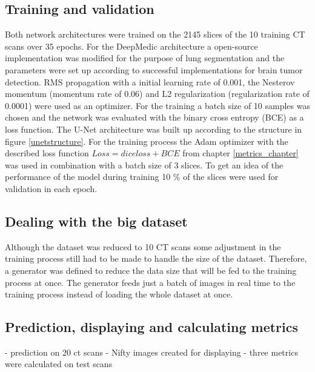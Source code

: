 \subsection{Training and validation}
Both network architectures were trained on the 2145 slices of the 10 training CT scans over 35 epochs.\newline
For the DeepMedic architecture a open-source implementation \cite{deepmedic} was modified for the purpose of lung segmentation and the parameters were set up according to successful implementations for brain tumor detection. RMS propagation with a initial learning rate of 0.001, the Nesterov momentum (momentum rate of 0.06) and L2 regularization (regularization rate of 0.0001) were used as an optimizer. For the training a batch size of 10 samples was chosen and the network was evaluated with the binary cross entropy (BCE) as a loss function.\newline
The U-Net architecture was built up according to the structure in figure \ref{unetstructure}. For the training process the Adam optimizer with the described loss function $Loss = dice loss + BCE$ from chapter \ref{metrics_chapter} was used in combination with a batch size of 3 slices. To get an idea of the performance of the model during training 10 \% of the slices were used for validation in each epoch.\newline

\subsection{Dealing with the big dataset}
Although the dataset was reduced to 10 CT scans some adjustment in the training process still had to be made to handle the size of the dataset.\newline
Therefore, a generator was defined to reduce the data size that will be fed to the training process at once. The generator feeds just a batch of images in real time to the training process instead of loading the whole dataset at once.

\subsection{Prediction, displaying and calculating metrics}

- prediction on 20 ct scans
- Nifty images created for displaying
- three metrics were calculated on test scans